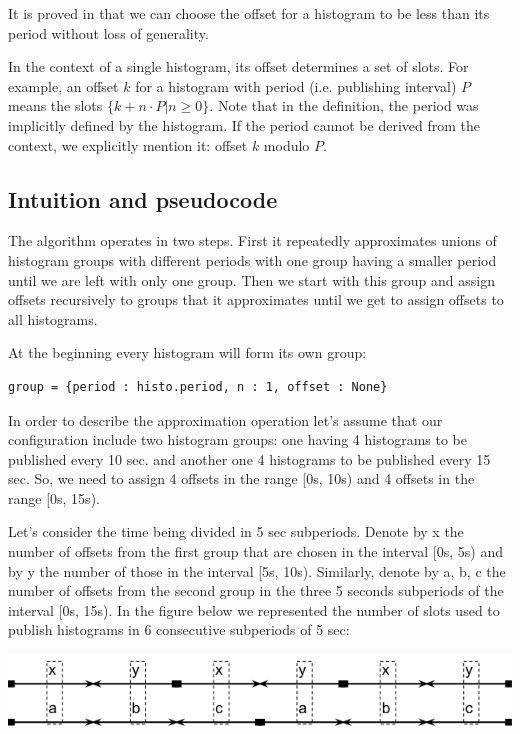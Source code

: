 It is proved in \citep{goossens2003scheduling} that we can choose the offset for a histogram to be less than its period without loss of generality. 

In the context of a single histogram, its offset determines a set of slots. For example, an offset $k$ for a histogram with period (i.e. publishing interval) $P$ means the slots $\{k+n\cdot P | n \geq 0\}$. Note that in the definition, the period was implicitly defined by the histogram. If the period cannot be derived from the context, we explicitly mention it: offset $k$ modulo $P$.

\subsection*{Intuition and pseudocode}

The algorithm operates in two steps. First it repeatedly approximates unions of histogram groups with different periods with one group having a smaller period until we are left with only one group. Then we start with this group and assign offsets recursively to groups that it approximates until we get to assign offsets to all histograms.

At the beginning every histogram will form its own group:
\begin{verbatim}
group = {period : histo.period, n : 1, offset : None}
\end{verbatim}
In order to describe the approximation operation let’s assume that our configuration include two histogram groups: one having 4 histograms to be published every 10 sec. and another one 4 histograms to be published every 15 sec. So, we need to assign 4 offsets in the range [0s, 10s) and 4 offsets in the range [0s, 15s).
 
Let’s consider the time being divided in 5 sec subperiods. Denote by x the number of offsets from the first group that are chosen in the interval [0s, 5s) and by y the number of those in the interval [5s, 10s). Similarly, denote by a, b, c the number of offsets from the second group in the three 5 seconds subperiods of the interval [0s, 15s). In the figure below we represented the number of slots used to publish histograms in 6 consecutive subperiods of 5 sec:

\begin{center}
\includegraphics[scale=0.6]{Images/subperiod.png}
\end{center}

